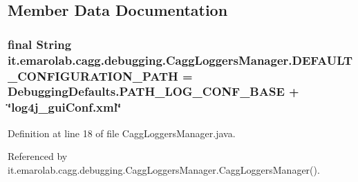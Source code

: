 \subsection{Member Data Documentation}
\hypertarget{classit_1_1emarolab_1_1cagg_1_1debugging_1_1CaggLoggersManager_a8747e94c7e76529ca883149dde22742e}{
\subsubsection[{D\-E\-F\-A\-U\-L\-T\-\_\-\-C\-O\-N\-F\-I\-G\-U\-R\-A\-T\-I\-O\-N\-\_\-\-P\-A\-T\-H}]{\setlength{\rightskip}{0pt plus 5cm}final String it.\-emarolab.\-cagg.\-debugging.\-Cagg\-Loggers\-Manager.\-D\-E\-F\-A\-U\-L\-T\-\_\-\-C\-O\-N\-F\-I\-G\-U\-R\-A\-T\-I\-O\-N\-\_\-\-P\-A\-T\-H = {\bf Debugging\-Defaults.\-P\-A\-T\-H\-\_\-\-L\-O\-G\-\_\-\-C\-O\-N\-F\-\_\-\-B\-A\-S\-E} + \char`\"{}log4j\-\_\-gui\-Conf.\-xml\char`\"{}\hspace{0.3cm}{\ttfamily [static]}}}\label{classit_1_1emarolab_1_1cagg_1_1debugging_1_1CaggLoggersManager_a8747e94c7e76529ca883149dde22742e}


Definition at line 18 of file Cagg\-Loggers\-Manager.\-java.



Referenced by it.\-emarolab.\-cagg.\-debugging.\-Cagg\-Loggers\-Manager.\-Cagg\-Loggers\-Manager().

